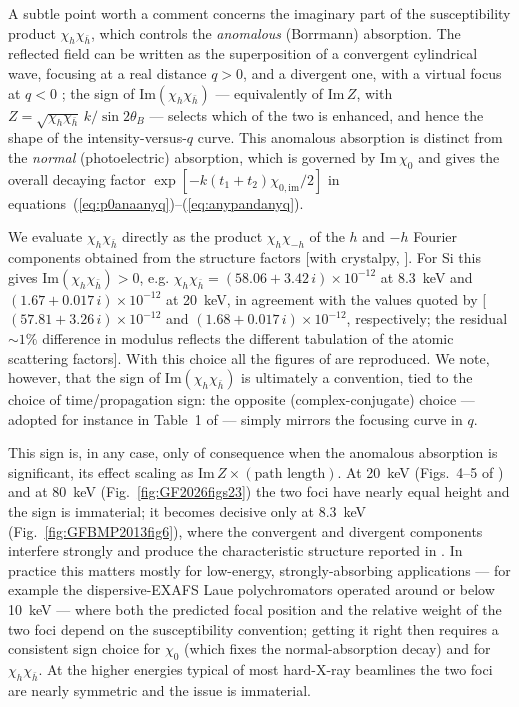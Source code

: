 \documentclass[preprint]{iucr}              %
\begin{document}
A subtle point worth a comment concerns the imaginary part of the susceptibility product $\chi_h\chi_{\bar h}$, which controls the \emph{anomalous} (Borrmann) absorption. The reflected field can be written as the superposition of a convergent cylindrical wave, focusing at a real distance $q>0$, and a divergent one, with a virtual focus at $q<0$ \cite{GuigayFerrero2013}; the sign of $\text{Im}(\chi_h\chi_{\bar h})$ --- equivalently of $\text{Im}\,Z$, with $Z=\sqrt{\chi_h\chi_{\bar h}}\,k/\sin 2\theta_B$ --- selects which of the two is enhanced, and hence the shape of the intensity-versus-$q$ curve. This anomalous absorption is distinct from the \emph{normal} (photoelectric) absorption, which is governed by $\text{Im}\,\chi_0$ and gives the overall decaying factor $\exp[-k(t_1+t_2)\chi_{0,\text{im}}/2]$ in equations~(\ref{eq:p0anaanyq})--(\ref{eq:anypandanyq}).

We evaluate $\chi_h\chi_{\bar h}$ directly as the product $\chi_h\chi_{-h}$ of the $h$ and $-h$ Fourier components obtained from the structure factors [with crystalpy, \cite{guigaySanchezdelrio2024}]. For Si this gives $\text{Im}(\chi_h\chi_{\bar h})>0$, e.g. $\chi_h\chi_{\bar h}=(58.06+3.42\,i)\times10^{-12}$ at \SI{8.3}{\kilo\eV} and $(1.67+0.017\,i)\times10^{-12}$ at \SI{20}{\kilo\eV}, in agreement with the values quoted by \cite{GuigayFerrero2013} [$(57.81+3.26\,i)\times10^{-12}$ and $(1.68+0.017\,i)\times10^{-12}$, respectively; the residual $\sim1\%$ difference in modulus reflects the different tabulation of the atomic scattering factors]. With this choice all the figures of \cite{GuigayFerrero2013, GuigayFerrero2016} are reproduced. We note, however, that the sign of $\text{Im}(\chi_h\chi_{\bar h})$ is ultimately a convention, tied to the choice of time/propagation sign: the opposite (complex-conjugate) choice --- adopted for instance in Table~1 of \cite{guigaySanchezdelrio2022} --- simply mirrors the focusing curve in $q$.

This sign is, in any case, only of consequence when the anomalous absorption is significant, its effect scaling as $\text{Im}\,Z\times(\text{path length})$. At \SI{20}{\kilo\eV} (Figs.~4--5 of \cite{GuigayFerrero2013}) and at \SI{80}{\kilo\eV} (Fig.~\ref{fig:GF2026figs23}) the two foci have nearly equal height and the sign is immaterial; it becomes decisive only at \SI{8.3}{\kilo\eV} (Fig.~\ref{fig:GFBMP2013fig6}), where the convergent and divergent components interfere strongly and produce the characteristic structure reported in \cite{GuigayFerrero2013}. In practice this matters mostly for low-energy, strongly-absorbing applications --- for example the dispersive-EXAFS Laue polychromators operated around or below \SI{10}{\kilo\eV} --- where both the predicted focal position and the relative weight of the two foci depend on the susceptibility convention; getting it right then requires a consistent sign choice for $\chi_0$ (which fixes the normal-absorption decay) and for $\chi_h\chi_{\bar h}$. At the higher energies typical of most hard-X-ray beamlines the two foci are nearly symmetric and the issue is immaterial.
\end{document}
